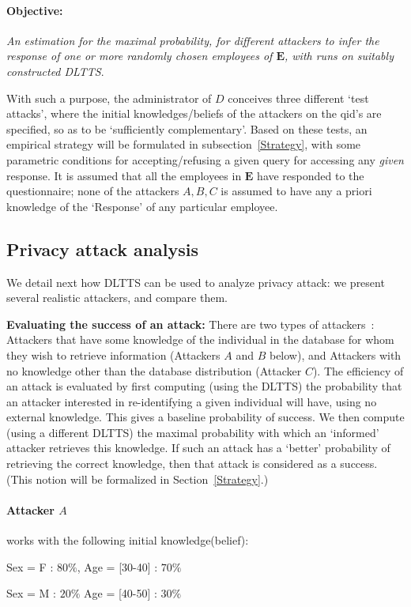 \documentclass[pdflatex]{article}
\def \lft {\noindent}
\begin{document}
\paragraph{Objective:}  {\em An estimation for the maximal probability, for different
  attackers to infer the response  of  one or more randomly chosen employees of
  $\mathbf{E}$, with runs on suitably constructed DLTTS}.
  
With  such a  purpose, the administrator of $D$ conceives three different `test attacks',
where the initial  knowledges/beliefs  of the attackers  on  the qid's are specified, so
as to be `sufficiently complementary'. Based on these tests, an empirical  strategy will
be formulated  in subsection~\ref{Strategy}, with  some  parametric conditions for
accepting/refusing a given  query for accessing any {\em given} response. 
It is assumed that all the employees in $\mathbf{E}$ have responded to the questionnaire;
none of the attackers  $A, B, C$ is assumed to have any a priori knowledge of the
`Response' of any particular employee.  

\subsection{Privacy attack analysis}
We detail next how DLTTS can be used to analyze privacy attack: we present
several realistic attackers, and compare them.


 \lft\textbf{Evaluating the success of an attack:}
  There are two types of attackers~: Attackers that have some knowledge of
  the individual in the database for whom they wish to retrieve information (Attackers $A$
  and $B$ below), and Attackers with no knowledge other than the database distribution
  (Attacker $C$). The efficiency of an attack is evaluated by first computing (using the
  DLTTS) the probability that an attacker interested in re-identifying a given individual
  will have, using no external knowledge. This gives a baseline probability of success.
  We then compute (using a different DLTTS) the maximal probability with which
  an `informed'  attacker  retrieves this knowledge. If such an attack has a `better'
  probability  of retrieving the correct knowledge, then that attack is considered
  as a success.   (This notion will be formalized in Section~\ref{Strategy}.)

\vspace*{-1.3em}
\paragraph{Attacker $A$} works with the following initial knowledge(belief): 
 \par  \hspace*{6mm} Sex = F : $80\%$,        \hspace*{2cm}  Age = [30-40] : $70\%$ 
 \par  \hspace*{6mm} Sex = M : $20\%$         \hspace*{2cm}  Age = [40-50] : $30\%$
 
\end{document}
